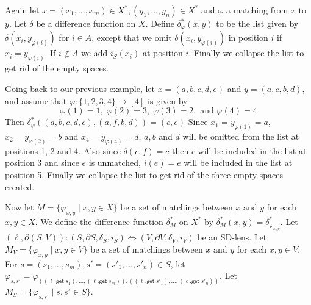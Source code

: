 \documentclass[acmsmall,review,anonymous]{acmart}\settopmatter{printfolios=true,printccs=false,printacmref=false}
\newcommand{\kw}[1]{\ensuremath{\mathsf{#1}}}
\newcommand{\get}{\ensuremath{\kw{get}}}
\begin{document}
Again let $x = (x_1, \ldots, x_m) \in X^*, (y_1, \ldots, y_n) \in X^*$ and
$\varphi$ a matching from $x$ to $y$. Let $\delta$ be a difference function on
$X$. Define $\delta^*_{\varphi}(x, y)$ to be the list given by $\delta(x_i,
y_{\varphi(i)})$ for $i \in A$, except that we omit $\delta(x_i,
y_{\varphi(i)})$ in position $i$ if $x_i = y_{\varphi(i)}$. If $i \not \in A$
we add $i_S(x_i)$ at position $i$. Finally we collapse the list to get rid of
the empty spaces. 

Going back to our previous example, let $x = (a, b, c, d, e)$ and $y = (a, c, b,
d)$, and assume that $\varphi : \{1, 2, 3, 4\} \longrightarrow [4]$ is
given by $$\varphi(1) = 1, \; \varphi(2) = 3, \; \varphi(3) = 2, \text{ and }
\varphi(4) = 4$$ Then $\delta_{\varphi}^*((a, b, c, d, e), (a, f, b, d)) = (c,
e)$ Since $x_1 = y_{\varphi(1)} = a$, $x_2 = y_{\varphi(2)} = b$ and $x_{4} =
y_{\varphi(4)} = d$, $a, b$ and $d$ will be omitted from the list at
positions 1, 2 and 4. Also since $\delta(c, f) = c$ then $c$ will be included in
the list at position 3 and since $e$ is unmatched, $i(e) = e$ will be
included in the list at position 5. Finally we collapse the list to get rid of
the three empty spaces created.

Now let $M = \{\varphi_{x, y} \; | \; x, y \in X\}$ be a set of matchings
between $x$ and $y$ for each $x, y \in X$. We define the difference function
$\delta^*_M$ on $X^*$ by $\delta^*_{M}(x, y) = \delta^*_{\varphi_{x, y}}$. Let
$(\ell, \partial (S, V)) : (S, \partial S, \delta_{S}, i_{S}) \Leftrightarrow
(V, \partial V, \delta_{V}, i_{V})$ be an SD-lens. Let $M_V = \{\varphi_{x, y}
\; | \; x, y \in V\}$ be a set of matchings between $x$ and $y$ for each $x, y
\in V$. For $s = (s_1, \ldots, s_m), s' = (s'_1, \ldots, s'_n) \in S$, let
$\varphi_{s, s'} = \varphi_{((\ell.\get \; s_1), \ldots, (\ell.\get \; s_m)),
((\ell.\get \; s'_1), \ldots, (\ell.\get \; s'_n))}$. Let $M_S = \{\varphi_{s,
s'} \; | \; s, s' \in S\}$. 
\end{document}
